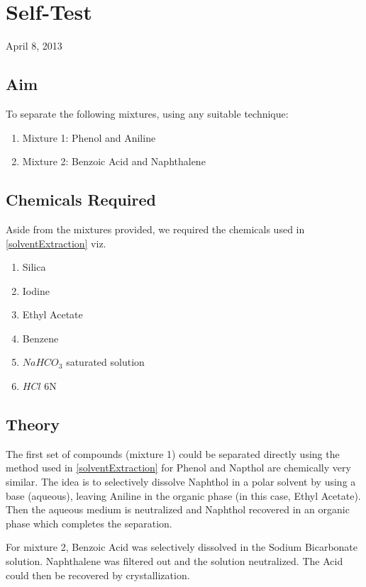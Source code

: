 \chapter{Self-Test}
\begin{flushright}
April 8, 2013
\end{flushright}
\section{Aim}
To separate the following mixtures, using any suitable technique:
\begin{enumerate}
	\item Mixture 1: Phenol and Aniline
	\item Mixture 2: Benzoic Acid and Naphthalene
\end{enumerate}

\section {Chemicals Required}
	Aside from the mixtures provided, we required the chemicals used in \autoref{solventExtraction} viz.
	\begin{enumerate}
		\item Silica
		\item Iodine
		\item Ethyl Acetate
		\item Benzene
		\item $NaHCO_3$ saturated solution
		\item $HCl$ 6N
	\end{enumerate}	

\section{Theory}
	The first set of compounds (mixture 1) could be separated directly using the method used in \autoref{solventExtraction} for Phenol and Napthol are chemically very similar. The idea is to selectively dissolve Naphthol in a polar solvent by using a base (aqueous), leaving Aniline in the organic phase (in this case, Ethyl Acetate). Then the aqueous medium is neutralized and Naphthol recovered in an organic phase which completes the separation.
	\par
	For mixture 2, Benzoic Acid was selectively dissolved in the Sodium Bicarbonate solution. Naphthalene was filtered out and the solution neutralized. The Acid could then be recovered by crystallization.
